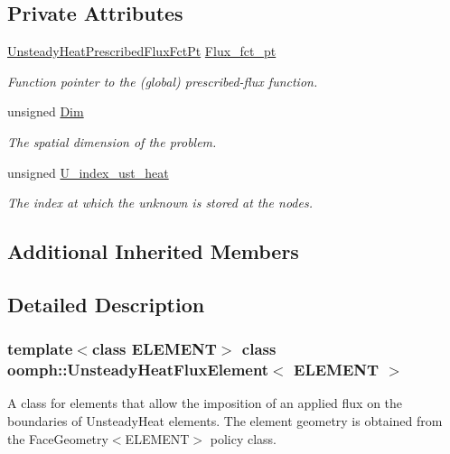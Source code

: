 \subsection*{Private Attributes}
\begin{DoxyCompactItemize}
\item 
\hyperlink{classoomph_1_1UnsteadyHeatFluxElement_ab60a211e1cee492be6c9b93d6aa36883}{Unsteady\+Heat\+Prescribed\+Flux\+Fct\+Pt} \hyperlink{classoomph_1_1UnsteadyHeatFluxElement_a49f232c696f25117cad07bcee6e0c868}{Flux\+\_\+fct\+\_\+pt}
\begin{DoxyCompactList}\small\item\em Function pointer to the (global) prescribed-\/flux function. \end{DoxyCompactList}\item 
unsigned \hyperlink{classoomph_1_1UnsteadyHeatFluxElement_a1e1a8cab700a63bcafe6ff3643cdfd51}{Dim}
\begin{DoxyCompactList}\small\item\em The spatial dimension of the problem. \end{DoxyCompactList}\item 
unsigned \hyperlink{classoomph_1_1UnsteadyHeatFluxElement_aa7109f19bb7404d1ba7abab5a2501d01}{U\+\_\+index\+\_\+ust\+\_\+heat}
\begin{DoxyCompactList}\small\item\em The index at which the unknown is stored at the nodes. \end{DoxyCompactList}\end{DoxyCompactItemize}
\subsection*{Additional Inherited Members}


\subsection{Detailed Description}
\subsubsection*{template$<$class E\+L\+E\+M\+E\+NT$>$\newline
class oomph\+::\+Unsteady\+Heat\+Flux\+Element$<$ E\+L\+E\+M\+E\+N\+T $>$}

A class for elements that allow the imposition of an applied flux on the boundaries of Unsteady\+Heat elements. The element geometry is obtained from the Face\+Geometry$<$\+E\+L\+E\+M\+E\+N\+T$>$ policy class. 

